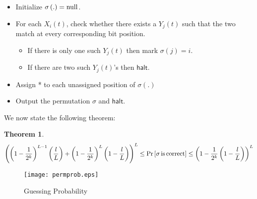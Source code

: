 \documentclass{llncs}
\begin{document}
\begin{itemize}
\item Initialize $\sigma \left( . \right) = {\rm{null}}$.
\item For each $X_i \left( t \right)$, check whether there exists a $Y_j \left( t \right)$ such that the two match at every corresponding bit position.
	\begin{itemize}
\item If there is only one such $Y_j \left( t \right)$ then mark $\sigma \left( j \right) = i$.
	\item If there are two such $Y_j \left( t \right)$'s then $\mathsf{halt}$.
	\end{itemize}
\item Assign * to each unassigned position of $\sigma \left( . \right)$ 
\item Output the permutation $\sigma$ and $\mathsf{halt}$.
\end{itemize}
We now state the following theorem:\\
\newtheorem{theo}{Theorem}
\begin{theo}
\[
\left( {\left( {1 - \frac{1}{{2^k }}} \right)^{L - 1} \left( {\frac{l}{L}} \right) + \left( {1 - \frac{1}{{2^k }}} \right)^L \left( {1 - \frac{l}{L}} \right)} \right)^L  \le \Pr \left[ {\sigma \,{\rm{is}}\,{\rm{correct}}} \right] \le \left( {1 - \frac{1}{{2^k }}\left( {1 - \frac{l}{L}} \right)} \right)^L 
\]


\end{theo}
\begin{figure}[ht]
\centerline{\texttt{[image: permprob.eps]}}
\caption{Guessing Probability}
\label{fig1}
\end{figure}
\end{document}
